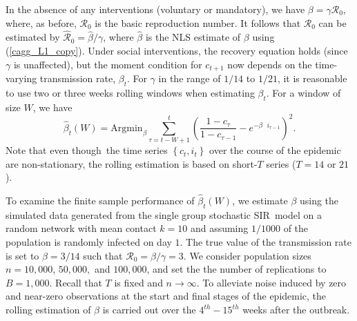 \documentclass[12pt]{article}
\begin{document}
In the absence of any interventions (voluntary or mandatory), we have
$\beta=\gamma\mathcal{R}_{0}$, where, as before, $\mathcal{R}_{0}$ is the
basic reproduction number. It follows that $\mathcal{R}_{0}$ can be estimated
by $\mathcal{\hat{R}}_{0}=\hat{\beta}/\gamma$, where $\hat{\beta}$ is the NLS
estimate of $\beta$ using (\ref{cagg_L1_copy}). Under social interventions,
the recovery equation holds (since $\gamma$ is unaffected), but the moment
condition for $c_{t+1}$ now depends on the time-varying transmission rate,
$\beta_{t}$. For $\gamma$ in the range of $1/14$ to $1/21$, it is reasonable
to use two or three weeks rolling windows when estimating $\beta_{t}$. For a
window of size $W$, we have
\begin{equation}
\hat{\beta}_{t}\left(  W\right)  =\text{Argmin}_{\beta}\sum_{\tau=t-W+1}%
^{t}\left(  \frac{1-c_{\tau}}{1-c_{\tau-1}}-e^{-\beta\text{ }i_{\tau-1}%
}\right)  ^{2}. \label{betathat}%
\end{equation}
Note that even though\ the time series $\left\{  c_{t},i_{t}\right\}  $ over
the course of the epidemic are non-stationary, the rolling estimation is based
on short-$T$ series ($T=14$ or $21$).

To examine the finite sample performance of $\hat{\beta}_{t}\left(  W\right)
$, we estimate $\beta$ using the simulated data generated from the single
group stochastic SIR\ model on a random network with mean contact $k=10$ and
assuming $1/1000$ of the population is randomly infected on day $1$. The true
value of the transmission rate is set to $\beta=3/14$ such that $\mathcal{R}%
_{0}=\beta/\gamma=3$. We consider population sizes $n=10,000$, $50,000,$ and
$100,000$, and set the the number of replications to $B=1,000$. Recall that
$T$ is fixed and $n\rightarrow\infty$. To alleviate noise induced by zero and
near-zero observations at the start and final stages of the epidemic, the
rolling estimation of $\beta$ is carried out over the $4^{th}-15^{th}$ weeks
after the outbreak.
\end{document}
